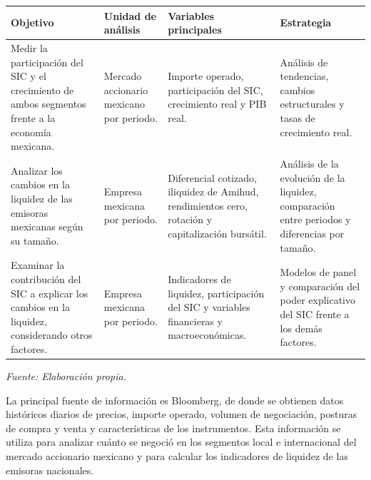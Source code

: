 {\small
\begin{longtable}[]{@{}
  >{\raggedright\arraybackslash}p{}
  >{\raggedright\arraybackslash}p{}
  >{\raggedright\arraybackslash}p{}
  >{\raggedright\arraybackslash}p{}@{}}
\toprule\noalign{}
\begin{minipage}[b]{\linewidth}\raggedright
\textbf{Objetivo}
\end{minipage} & \begin{minipage}[b]{\linewidth}\raggedright
\textbf{Unidad de análisis}
\end{minipage} & \begin{minipage}[b]{\linewidth}\raggedright
\textbf{Variables principales}
\end{minipage} & \begin{minipage}[b]{\linewidth}\raggedright
\textbf{Estrategia}
\end{minipage} \\
\midrule\noalign{}
\endhead
\bottomrule\noalign{}
\endlastfoot
Medir la participación del SIC y el crecimiento de ambos segmentos frente a la economía mexicana. & Mercado accionario mexicano por periodo. & Importe operado, participación del SIC, crecimiento real y PIB real. & Análisis de tendencias, cambios estructurales y tasas de crecimiento real. \\
Analizar los cambios en la liquidez de las emisoras mexicanas según su tamaño. & Empresa mexicana por periodo. & Diferencial cotizado, iliquidez de Amihud, rendimientos cero, rotación y capitalización bursátil. & Análisis de la evolución de la liquidez, comparación entre periodos y diferencias por tamaño. \\
Examinar la contribución del SIC a explicar los cambios en la liquidez, considerando otros factores. & Empresa mexicana por periodo. & Indicadores de liquidez, participación del SIC y variables financieras y macroeconómicas. & Modelos de panel y comparación del poder explicativo del SIC frente a los demás factores. \\
\end{longtable}
}

\emph{Fuente: Elaboración propia.}



La principal fuente de información es Bloomberg, de donde se obtienen datos históricos diarios de precios, importe operado, volumen de negociación, posturas de compra y venta y características de los instrumentos. Esta información se utiliza para analizar cuánto se negoció en los segmentos local e internacional del mercado accionario mexicano y para calcular los indicadores de liquidez de las emisoras nacionales.


